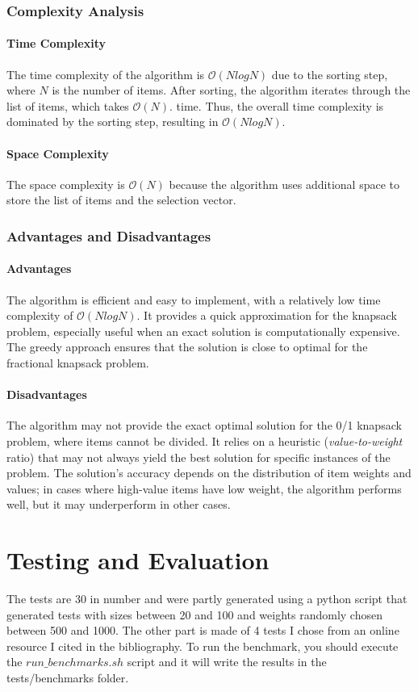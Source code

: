 \documentclass{llncs}
\begin{document}
\subsubsection{Complexity Analysis}
\paragraph{Time Complexity}
The time complexity of the algorithm is $\mathcal{O}(NlogN)$ due to the sorting step, where $N$ is
the number of items. After sorting, the algorithm iterates through the list of items, which takes $\mathcal{O}(N)$.
time. Thus, the overall time complexity is dominated by the sorting step, resulting in 
$\mathcal{O}(NlogN)$.

\paragraph{Space Complexity}
The space complexity is $\mathcal{O}(N)$ because the algorithm uses additional space to store the
list of items and the selection vector.

\subsubsection{Advantages and Disadvantages}
\paragraph{Advantages}
The algorithm is efficient and easy to implement, with a relatively low time complexity of 
$\mathcal{O}(NlogN)$. It provides a quick approximation for the knapsack problem, especially useful
when an exact solution is computationally expensive. The greedy approach ensures that the solution
is close to optimal for the fractional knapsack problem.

\paragraph{Disadvantages}
The algorithm may not provide the exact optimal solution for the 0/1 knapsack problem, where items
cannot be divided. It relies on a heuristic (\textit{value-to-weight} ratio) that may not always
yield the best solution for specific instances of the problem. The solution's accuracy depends on 
the distribution of item weights and values; in cases where high-value items have low weight, the 
algorithm performs well, but it may underperform in other cases.

\section{Testing and Evaluation}
The tests are 30 in number and were partly generated using a python script that generated tests with
sizes between 20 and 100 and weights randomly chosen between 500 and 1000. The other part is made of
4 tests I chose from an online resource I cited in the bibliography. To run the benchmark, you should
execute the $run\_benchmarks.sh$ script and it will write the results in the 
tests/benchmarks folder.
\end{document}

